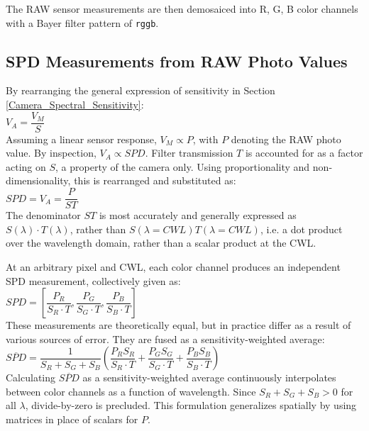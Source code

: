 \documentclass[twocolumn,10pt]{asme2ej}
\newcommand{\id}{\hspace{6 mm}}
\begin{document}
The RAW sensor measurements are then demosaiced into R, G, B color channels with a Bayer filter pattern of \texttt{rggb}.

\subsection{SPD Measurements from RAW Photo Values}

 By rearranging the general expression of sensitivity in Section \ref{Camera_Spectral_Sensitivity}: \\

 $V_A = \dfrac{V_M}{S}$ \\

Assuming a linear sensor response, $V_M \propto P$, with $P$ denoting the RAW photo value. By inspection, $V_A \propto SPD$. Filter transmission $T$ is accounted for as a factor acting on $S$, a property of the camera only. Using proportionality and non-dimensionality, this is rearranged and substituted as: \\

 $SPD = V_A = \dfrac{P}{ST}$ \\

The denominator $ST$ is most accurately and generally expressed as $S(\lambda) \cdot T(\lambda)$, rather than $S(\lambda=CWL) T(\lambda=CWL)$, i.e. a dot product over the wavelength domain, rather than a scalar product at the CWL.

\id At an arbitrary pixel and CWL, each color channel produces an independent SPD measurement, collectively given as: \\

 $SPD = \left[ \dfrac{P_R}{S_R \cdot T},\dfrac{P_G}{S_G \cdot T},\dfrac{P_B}{S_B \cdot T} \right] $ \\

These measurements are theoretically equal, but in practice differ as a result of various sources of error. They are fused as a sensitivity-weighted average: \\

$\overline{SPD} = \dfrac{1}{S_R+S_G+S_B} \left( \dfrac{P_R S_R}{S_R \cdot T} + \dfrac{P_G S_G}{S_G \cdot T} + \dfrac{P_B S_B}{S_B \cdot T} \right)$\\

Calculating $\overline{SPD}$ as a sensitivity-weighted average continuously interpolates between color channels as a function of wavelength. Since $S_R+S_G+S_B > 0$ for all $\lambda$, divide-by-zero is precluded. This formulation generalizes spatially by using matrices in place of scalars for $P$.
\end{document}
